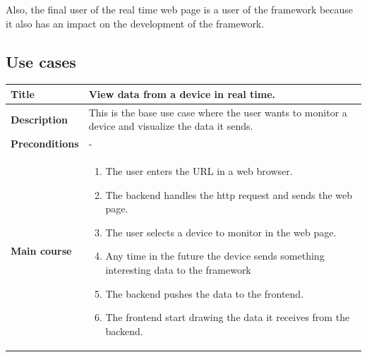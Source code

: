 \documentclass[12pt]{article}
\begin{document}
            Also, the final user of the real time web page is a user of the
            framework because it also has an impact on the development of the
            framework.

        \subsection{Use cases}
            \setlength{\parindent}{0cm}
            \begin{tabularx}{\textwidth}{|l|X|}
                \hline
                \textbf{Title} & View data from a device in real time.\\
                \hline
                \textbf{Description} & This is the base use case where the user
                wants to monitor a device and visualize the data it sends.\\
                \hline
                \textbf{Preconditions} & - \\
                \hline
                \textbf{Main course} &
                    \begin{enumerate}
                        \item The user enters the URL in a web browser.
                        \item The backend handles the http request and sends the
                              web page.
                        \item The user selects a device to monitor in the web
                              page.
                        \item Any time in the future the device sends something
                              interesting data to the framework
                        \item The backend pushes the data to the frontend.
                        \item The frontend start drawing the data it receives
                              from the backend.
                    \end{enumerate}\\
                \hline
            \end{tabularx}
\end{document}
